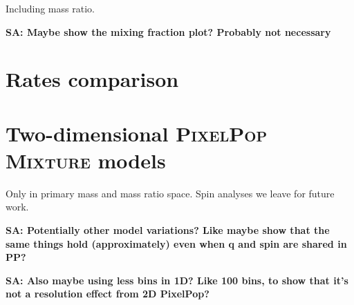 \documentclass[twocolumn,twocolappendix,linenumbers]{aastex631}
\newcommand{\sa}[1]{{\bf\color{Thistle}SA: #1}}
\newcommand{\PPMixture}{\textsc{PixelPop Mixture}\xspace}
\begin{document}
Including mass ratio.

\sa{Maybe show the mixing fraction plot? Probably not necessary}

\section{Rates comparison}\label{app:rates}

\section{Two-dimensional \PPMixture models}\label{app:2d-pp-mixture}

Only in primary mass and mass ratio space. Spin analyses we leave for future work. 

\sa{Potentially other model variations? Like maybe show that the same things hold (approximately) even when q and spin are shared in PP? }

\sa{Also maybe using less bins in 1D? Like 100 bins, to show that it's not a resolution effect from 2D PixelPop?}



\end{document}

